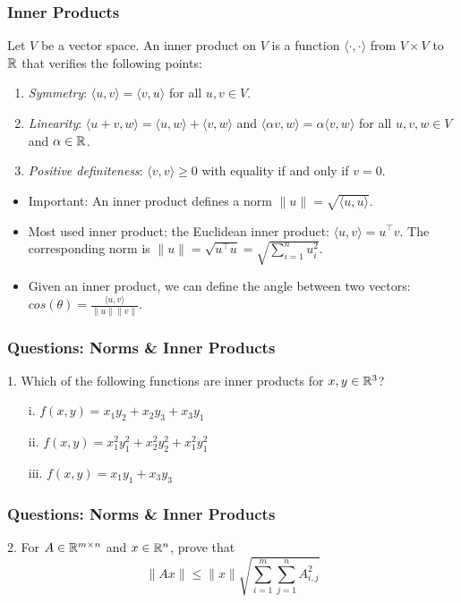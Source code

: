 \documentclass{beamer}
\begin{document}
\begin{frame}[t]
\frametitle{Inner Products}
\begin{definition}
	Let $V$ be a vector space.
	An inner product on $V$ is a function $\langle \cdot, \cdot \rangle$ from $V \times V$ to $\mathbb{R}$ that verifies the following points:
	\begin{enumerate}
		\item \emph{Symmetry}: $\langle u, v \rangle = \langle v, u\rangle$ for all $u,v \in V$.
		\item \emph{Linearity}: $\langle u+v, w \rangle = \langle u, w\rangle + \langle v, w\rangle$ and $\langle \alpha v, w \rangle = \alpha \langle v, w \rangle$ for all $u,v,w \in V$ and $\alpha \in \mathbb{R}$.
		\item \emph{Positive definiteness}: $\langle v, v\rangle \geq 0$ with equality if and only if $v = 0$.
\end{enumerate}
\end{definition}
\begin{itemize}
\item Important: An inner product defines a norm $\|u\| = \sqrt{\langle u, u \rangle}$.
\item Most used inner product: the Euclidean inner product: $\langle u,v \rangle = u^\top v$. The corresponding norm is $\|u\|= \sqrt{u^\top u} = \sqrt{\sum_{i=1}^n u_i^2}$.
\item Given an inner product, we can define the angle between two vectors: $cos(\theta) = \frac{ \langle u,v \rangle }{\|u\| \|v\|}$.
\end{itemize}
\end{frame}

\begin{frame}[t]
\frametitle{Questions: Norms \& Inner Products}
1. Which of the following functions are inner products for $x,y\in\mathbb{R}^3$?
\begin{enumerate}
\item[i.] $f(x,y) = x_1y_2+x_2y_3+x_3y_1$
\item[ii.] $f(x,y) = x_1^2y_1^2+x_2^2y_2^2+x_1^2y_1^2$
\item[iii.] $f(x,y) = x_1y_1+x_3y_3$
\end{enumerate}
\pause
\pause
\end{frame}

\begin{frame}[t]
\frametitle{Questions: Norms \& Inner Products}
2. For $A \in \mathbb{R}^{m\times n}$ and $x\in \mathbb{R}^n$, prove that
$$ \|Ax\| \leq \|x\|\sqrt{\sum_{i=1}^m \sum_{j=1}^n A_{i,j}^2}$$
\pause
\end{frame}
\end{document}
